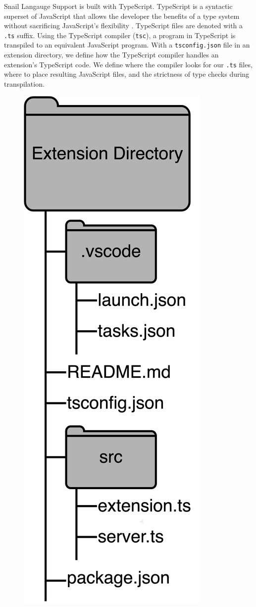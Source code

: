 \documentclass{article}
\begin{document}
Snail Langauge Support is built with TypeScript. TypeScript is a syntactic superset of JavaScript that allows the developer the benefits of a type system without sacrificing JavaScript's flexibility \cite{TypeScript_2023}. TypeScript files are denoted with a \lstinline{.ts} suffix. Using the TypeScript compiler (\lstinline{tsc}), a program in TypeScript is transpiled to an equivalent JavaScript program. With a \lstinline{tsconfig.json} file in an extension directory, we define how the TypeScript compiler handles an extension's TypeScript code. We define where the compiler looks for our \lstinline{.ts} files, where to place resulting JavaScript files, and the strictness of type checks during transpilation.


\begin{figure}
    \begin{center}
        \includegraphics[height=0.3\textheight]{directory-structure.png}

\end{center}
\end{figure}
\end{document}
